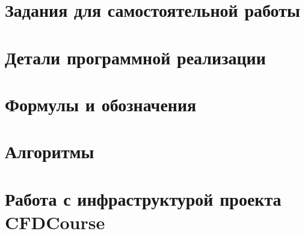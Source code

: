 \documentclass[a4paper,12pt]{article}
\numberwithin{equation}{section}
\begin{document}
\newpage
\tableofcontents
\newpage












\appendix
\section{Задания для самостоятельной работы}
















\section{Детали программной реализации}




\section{Формулы и обозначения}




\section{Алгоритмы}




\section{Работа с инфраструктурой проекта CFDCourse}





\end{document}
